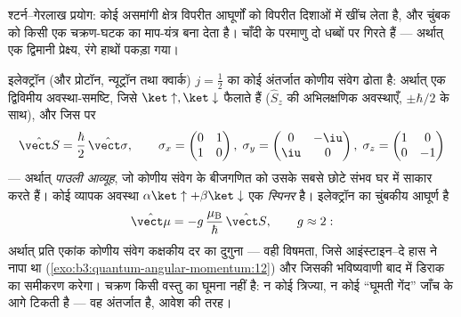 \begin{omfigure}

{\small श्टर्न--गेरलाख प्रयोग: कोई असमांगी क्षेत्र विपरीत आघूर्णों को
विपरीत दिशाओं में खींच लेता है, और चुंबक को किसी एक चक्रण-घटक का
माप-यंत्र बना देता है। चाँदी के परमाणु दो धब्बों पर गिरते हैं ---
अर्थात् एक द्विमानी प्रेक्ष्य, रंगे हाथों पकड़ा गया।}
\end{omfigure}

\begin{definition}[चक्रण एक-बटा-दो]\label{def:b3:spin-two-level:spin}
इलेक्ट्रॉन (और प्रोटॉन, न्यूट्रॉन तथा क्वार्क) $j = \tfrac12$ का कोई
अंतर्जात कोणीय संवेग ढोता है: अर्थात् एक द्विविमीय
अवस्था-समष्टि, जिसे $\ket\uparrow, \ket\downarrow$ फैलाते हैं
($\hat S_z$ की अभिलक्षणिक अवस्थाएँ, $\pm\hbar/2$ के साथ), और जिस पर
\[
\hat{\vect S} = \frac\hbar2\,\hat{\vect\sigma} , \qquad
\sigma_x = \begin{pmatrix}0&1\\1&0\end{pmatrix} ,\;
\sigma_y = \begin{pmatrix}0&-\iu\\\iu&0\end{pmatrix} ,\;
\sigma_z = \begin{pmatrix}1&0\\0&-1\end{pmatrix}
\]
--- अर्थात् \emph{पाउली आव्यूह}, जो कोणीय संवेग के बीजगणित को उसके
सबसे छोटे संभव घर में साकार करते हैं। कोई व्यापक अवस्था
$\alpha\ket\uparrow + \beta\ket\downarrow$ एक \emph{स्पिनर} है।
इलेक्ट्रॉन का चुंबकीय आघूर्ण है
\[
\hat{\vect\mu} = -g\,\frac{\mu_{\text{B}}}{\hbar}\,\hat{\vect S} ,
\qquad g \approx 2 :
\]
अर्थात् प्रति एकांक कोणीय संवेग कक्षकीय दर का दुगुना --- वही विषमता,
जिसे आइंस्टाइन--दे हास ने नापा था
(\cref{exo:b3:quantum-angular-momentum:12}) और जिसकी भविष्यवाणी बाद
में डिराक का समीकरण करेगा। चक्रण किसी वस्तु का घूमना नहीं है: न कोई
त्रिज्या, न कोई ``घूमती गेंद'' जाँच के आगे टिकती है --- वह अंतर्जात
है, आवेश की तरह।
\end{definition}

